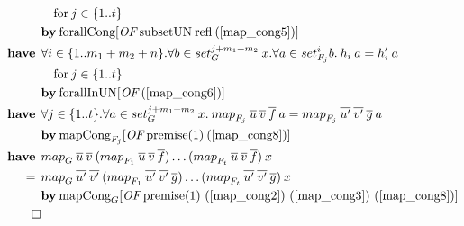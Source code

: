 \begin{align}
 & \quad \text{for} \: j \in \{1..t\} \nonumber \\*
 & \by \OF{\text{forallCong}}{\text{subsetUN} \: \text{refl} \: (\ref{map_cong5})} \nonumber \\
%
\have & \forall i \in \{1..m_1+m_2+n\}. \forall b \in set_G^{j+m_1+m_2} \: x. \forall a \in set_{F_j}^i b. \: h_i \: a = h'_i \: a \label{map_cong7} \\*
 & \quad \text{for} \: j \in \{1..t\} \nonumber \\*
 & \by \OF{\text{forallInUN}}{(\ref{map_cong6})} \nonumber \\
%
\have & \forall j \in \{1..t\}. \forall a \in set_G^{j+m_1+m_2} \: x. \: \map{F_j}{u}{v}{f} \: a = \map{F_j}{u'}{v'}{g} \: a \label{map_cong8} \\*
 & \by \OF{\text{mapCong}_{F_j}}{\text{premise(1)} \: (\ref{map_cong8})} \nonumber \\
%
\have & \map{G}{u}{v}{}(\map{F_1}{u}{v}{f})\dots(\map{F_t}{u}{v}{f}) \: x \nonumber \\*
= \:\: & \map{G}{u'}{v'}{}(\map{F_1}{u'}{v'}{g})\dots(\map{F_t}{u'}{v'}{g}) \: x \\*
 & \by \OF{\text{mapCong}_G}{\text{premise(1) (\ref{map_cong2}) (\ref{map_cong3}) (\ref{map_cong8})}} \nonumber \\*
\qed \nonumber
\end{align}


